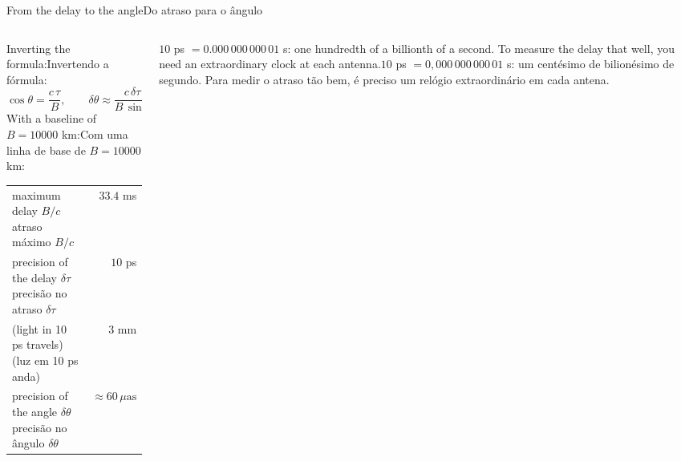 \documentclass[aspectratio=169,11pt]{beamer}
\newcommand{\tr}[2]{\ifEN#2\else#1\fi}
\newcommand{\bnum}[1]{\textbf{\textcolor{mTeal}{#1}}}
\newcommand{\uas}{\ensuremath{\,\mu\mathrm{as}}\xspace}
\begin{document}
\begin{frame}{\tr{Do atraso para o ângulo}{From the delay to the angle}}
  \begin{columns}[T]
    \begin{column}{0.52\textwidth}
      \small
      \tr{Invertendo a fórmula:}{Inverting the formula:}
      \[ \cos\theta = \frac{c\,\tau}{B}, \qquad \delta\theta \approx \frac{c\,\delta\tau}{B\,\sin\theta} \]
      \tr{Com uma linha de base de $B = \num{10000}$ km:}{With a baseline of $B = \num{10000}$ km:}
      \medskip
      \centering
      \renewcommand{\arraystretch}{1.35}
      \begin{tabular}{lr}
        \toprule
        \tr{atraso máximo $B/c$}{maximum delay $B/c$} & $\num{33.4}$ ms \\
        \tr{precisão no atraso $\delta\tau$}{precision of the delay $\delta\tau$} & $10$ ps \\
        \tr{(luz em 10 ps anda)}{(light in 10 ps travels)} & $3$ mm \\
        \tr{precisão no ângulo $\delta\theta$}{precision of the angle $\delta\theta$} & \bnum{$\approx 60\uas$} \\
        \bottomrule
      \end{tabular}
    \end{column}
    \begin{column}{0.44\textwidth}
      \begin{armadilha}[title={\tr{Quão pequeno é 10 ps?}{How small is 10 ps?}}]
        \small\tr{$10$ ps $= 0{,}000\,000\,000\,01$ s: um centésimo de bilionésimo de segundo.
        Para medir o atraso tão bem, é preciso um relógio \alert{extraordinário} em cada
        antena.}{$10$ ps $= 0.000\,000\,000\,01$ s: one hundredth of a billionth of a second. To
        measure the delay that well, you need an \alert{extraordinary} clock at each antenna.}
      \end{armadilha}
    \end{column}
  \end{columns}
\end{frame}
\end{document}
